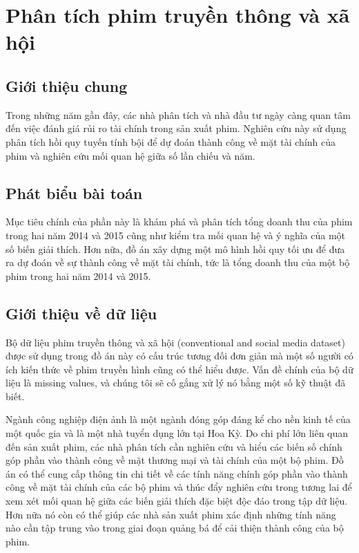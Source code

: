 \section{Phân tích phim truyền thông và xã hội}

\subsection{Giới thiệu chung}

Trong những năm gần đây, các nhà phân tích và nhà đầu tư ngày càng quan tâm đến việc đánh giá rủi ro tài chính trong sản xuất phim. Nghiên cứu này sử dụng phân tích hồi quy tuyến tính bội để dự đoán thành công về mặt tài chính của phim và nghiên cứu mối quan hệ giữa số lần chiếu và năm.

\subsection{Phát biểu bài toán}

Mục tiêu chính của phần này là khám phá và phân tích tổng doanh thu của phim trong hai năm 2014 và 2015 cũng như kiểm tra mối quan hệ và ý nghĩa của một số biến giải thích. Hơn nữa, đồ án xây dựng một mô hình hồi quy tối ưu để đưa ra dự đoán về sự thành công về mặt tài chính, tức là tổng doanh thu của một bộ phim trong hai năm 2014 và 2015. 


\subsection{Giới thiệu về dữ liệu}

Bộ dữ liệu phim truyền thông và xã hội (conventional and social media dataset) được sử dụng trong đồ án này có cấu trúc tương đối đơn giản mà một số người có ích kiến thức về phim truyền hình cũng có thể hiểu được. Vấn đề chính của bộ dữ liệu là missing values, và chúng tôi sẽ cố gắng xử lý nó bằng một số kỹ thuật đã biết.

Ngành công nghiệp điện ảnh là một ngành đóng góp đáng kể cho nền kinh tế của một quốc gia và là một nhà tuyển dụng lớn tại Hoa Kỳ. Do chi phí lớn liên quan đến sản xuất phim, các nhà phân tích cần nghiên cứu và hiểu các biến số chính góp phần vào thành công về mặt thương mại và tài chính của một bộ phim. Đồ án có thể cung cấp thông tin chi tiết về các tính năng chính góp phần vào thành công về mặt tài chính của các bộ phim và thúc đẩy nghiên cứu trong tương lai để xem xét mối quan hệ giữa các biến giải thích đặc biệt độc đáo trong tập dữ liệu. Hơn nữa nó còn có thể giúp các nhà sản xuất phim xác định những tính năng nào cần tập trung vào trong giai đoạn quảng bá để cải thiện thành công của bộ phim.



